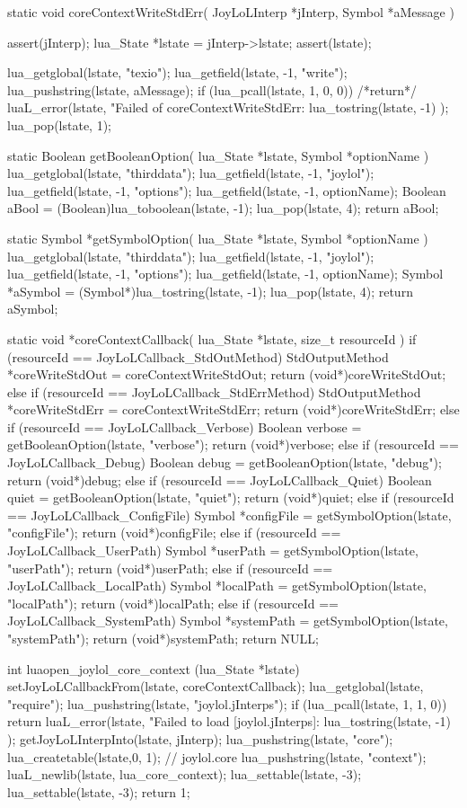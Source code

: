 static void coreContextWriteStdErr(
  JoyLoLInterp *jInterp,
  Symbol       *aMessage
) {
  assert(jInterp);
  lua_State *lstate = jInterp->lstate;
  assert(lstate);
  
  lua_getglobal(lstate, "texio");
  lua_getfield(lstate, -1, "write");
  lua_pushstring(lstate, aMessage);
  if (lua_pcall(lstate, 1, 0, 0)) {
    /*return*/ luaL_error(lstate,
      "Failed of coreContextWriteStdErr\nERROR:\n%
      lua_tostring(lstate, -1)
    );
  }
  lua_pop(lstate, 1);
}

static Boolean getBooleanOption(
  lua_State *lstate, 
  Symbol    *optionName
) {
  lua_getglobal(lstate, "thirddata");
  lua_getfield(lstate, -1, "joylol");
  lua_getfield(lstate, -1, "options");
  lua_getfield(lstate, -1, optionName);
  Boolean aBool = (Boolean)lua_toboolean(lstate, -1);
  lua_pop(lstate, 4);
  return aBool;
}

static Symbol *getSymbolOption(
  lua_State *lstate,
  Symbol    *optionName
) {
  lua_getglobal(lstate, "thirddata");
  lua_getfield(lstate, -1, "joylol");
  lua_getfield(lstate, -1, "options");
  lua_getfield(lstate, -1, optionName);
  Symbol *aSymbol = (Symbol*)lua_tostring(lstate, -1);
  lua_pop(lstate, 4);
  return aSymbol;
}

static void *coreContextCallback(
  lua_State *lstate,
  size_t resourceId
) {
  if (resourceId == JoyLoLCallback_StdOutMethod) {
    StdOutputMethod *coreWriteStdOut =
      coreContextWriteStdOut;
    return (void*)coreWriteStdOut;
  } else if (resourceId == JoyLoLCallback_StdErrMethod) {
    StdOutputMethod *coreWriteStdErr =
      coreContextWriteStdErr;
    return (void*)coreWriteStdErr;
  } else if (resourceId == JoyLoLCallback_Verbose) {
    Boolean verbose = getBooleanOption(lstate, "verbose");
    return (void*)verbose;
  } else if (resourceId == JoyLoLCallback_Debug) {
    Boolean debug = getBooleanOption(lstate, "debug");
    return (void*)debug;
  } else if (resourceId == JoyLoLCallback_Quiet) {
    Boolean quiet = getBooleanOption(lstate, "quiet");
    return (void*)quiet;
  } else if (resourceId == JoyLoLCallback_ConfigFile) {
    Symbol *configFile = getSymbolOption(lstate, "configFile");
    return (void*)configFile;
  } else if (resourceId == JoyLoLCallback_UserPath) {
    Symbol *userPath = getSymbolOption(lstate, "userPath");
    return (void*)userPath;
  } else if (resourceId == JoyLoLCallback_LocalPath) {
    Symbol *localPath = getSymbolOption(lstate, "localPath");
    return (void*)localPath;
  } else if (resourceId == JoyLoLCallback_SystemPath) {
    Symbol *systemPath = getSymbolOption(lstate, "systemPath");
    return (void*)systemPath;
  }
  return NULL;
}
\stopCCode

\startCCode
int luaopen_joylol_core_context (lua_State *lstate) {
  setJoyLoLCallbackFrom(lstate, coreContextCallback);
  lua_getglobal(lstate, "require");
  lua_pushstring(lstate, "joylol.jInterps");
  if (lua_pcall(lstate, 1, 1, 0)) {
    return luaL_error(lstate,
      "Failed to load [joylol.jInterps]\nERROR:\n%
      lua_tostring(lstate, -1)
    );
  }
  getJoyLoLInterpInto(lstate, jInterp);
  lua_pushstring(lstate, "core");
  lua_createtable(lstate,0, 1); // joylol.core 
  lua_pushstring(lstate, "context");
  luaL_newlib(lstate, lua_core_context);
  lua_settable(lstate, -3);
  lua_settable(lstate, -3);
  return 1;
}
\stopCCode